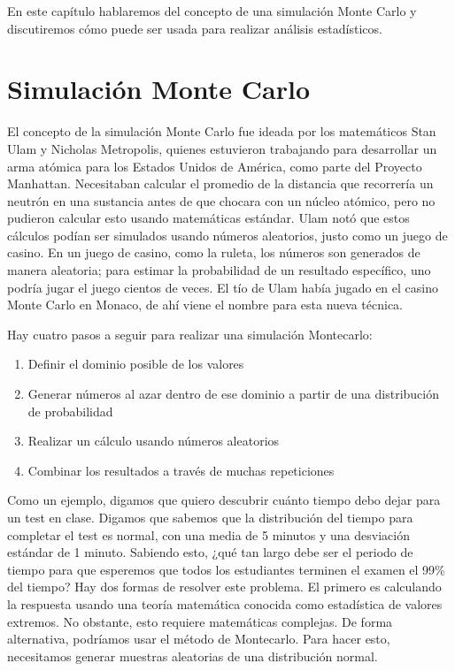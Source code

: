 \documentclass[
  12pt,
]{book}
\providecommand{\tightlist}{%
  \setlength{\itemsep}{0pt}\setlength{\parskip}{0pt}}
\begin{document}
En este capítulo hablaremos del concepto de una simulación Monte Carlo y discutiremos cómo puede ser usada para realizar análisis estadísticos.

\hypertarget{simulaciuxf3n-monte-carlo}{%
\section{Simulación Monte Carlo}\label{simulaciuxf3n-monte-carlo}}

El concepto de la simulación Monte Carlo fue ideada por los matemáticos Stan Ulam y Nicholas Metropolis, quienes estuvieron trabajando para desarrollar un arma atómica para los Estados Unidos de América, como parte del Proyecto Manhattan. Necesitaban calcular el promedio de la distancia que recorrería un neutrón en una sustancia antes de que chocara con un núcleo atómico, pero no pudieron calcular esto usando matemáticas estándar. Ulam notó que estos cálculos podían ser simulados usando números aleatorios, justo como un juego de casino. En un juego de casino, como la ruleta, los números son generados de manera aleatoria; para estimar la probabilidad de un resultado específico, uno podría jugar el juego cientos de veces. El tío de Ulam había jugado en el casino Monte Carlo en Monaco, de ahí viene el nombre para esta nueva técnica.

Hay cuatro pasos a seguir para realizar una simulación Montecarlo:

\begin{enumerate}
\def\labelenumi{\arabic{enumi}.}
\tightlist
\item
  Definir el dominio posible de los valores
\item
  Generar números al azar dentro de ese dominio a partir de una distribución de probabilidad
\item
  Realizar un cálculo usando números aleatorios
\item
  Combinar los resultados a través de muchas repeticiones
\end{enumerate}

Como un ejemplo, digamos que quiero descubrir cuánto tiempo debo dejar para un test en clase. Digamos que sabemos que la distribución del tiempo para completar el test es normal, con una media de 5 minutos y una desviación estándar de 1 minuto. Sabiendo esto, ¿qué tan largo debe ser el periodo de tiempo para que esperemos que todos los estudiantes terminen el examen el 99\% del tiempo? Hay dos formas de resolver este problema. El primero es calculando la respuesta usando una teoría matemática conocida como estadística de valores extremos. No obstante, esto requiere matemáticas complejas. De forma alternativa, podríamos usar el método de Montecarlo. Para hacer esto, necesitamos generar muestras aleatorias de una distribución normal.
\end{document}
